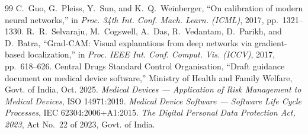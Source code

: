 \documentclass[conference]{IEEEtran}
\begin{document}
\begin{thebibliography}{99}
 C.~Guo, G.~Pleiss, Y.~Sun, and K.~Q.~Weinberger, ``On calibration of modern neural networks,'' in
\textit{Proc. 34th Int. Conf. Mach. Learn. (ICML)}, 2017, pp.~1321--1330.
 R.~R.~Selvaraju, M.~Cogswell, A.~Das, R.~Vedantam, D.~Parikh, and D.~Batra, ``Grad-CAM: Visual
explanations from deep networks via gradient-based localization,'' in \textit{Proc. IEEE Int. Conf. Comput. Vis.
(ICCV)}, 2017, pp.~618--626.
 Central Drugs Standard Control Organisation, ``Draft guidance document on medical device
software,'' Ministry of Health and Family Welfare, Govt. of India, Oct. 2025.
 \textit{Medical Devices --- Application of Risk Management to Medical Devices}, ISO 14971:2019.
 \textit{Medical Device Software --- Software Life Cycle Processes}, IEC 62304:2006+A1:2015.
 \textit{The Digital Personal Data Protection Act, 2023}, Act No.~22 of 2023, Govt. of India.
\end{thebibliography}
\end{document}
